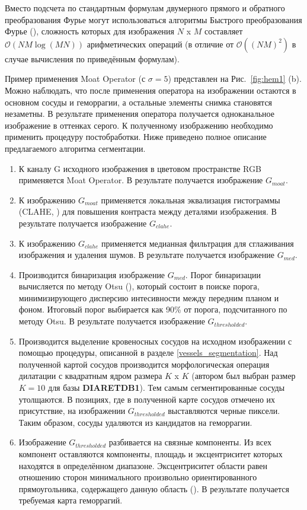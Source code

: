 \documentclass[12pt,fleqn]{article}
\begin{document}
Вместо подсчета по стандартным формулам двумерного прямого и обратного преобразования Фурье могут использоваться алгоритмы Быстрого преобразования Фурье (\cite[стр. 134]{szeliski}), сложность которых для изображения $N$ x $M$ составляет $\mathcal{O}(NM \log(MN))$ арифметических операций (в отличие от $\mathcal{O}\left((NM)^2\right)$ в случае вычисления по приведённым формулам). 

Пример применения Moat Operator (с $\sigma = 5$) представлен на Рис.~\ref{fig:hem1} (b). Можно наблюдать, что после применения оператора на изображении остаются в основном сосуды и геморрагии, а остальные элементы снимка становятся незаметны. В результате применения оператора получается одноканальное изображение в оттенках серого. К полученному изображению необходимо применить процедуру постобработки. Ниже приведено полное описание предлагаемого алгоритма сегментации.

\begin{enumerate}
\item К каналу G исходного изображения в цветовом пространстве RGB применяется Moat Operator. В результате получается изображение $G_{moat}$.
\item К изображению $G_{moat}$ применяется локальная эквализация гистограммы (CLAHE, \cite[стр. 110]{szeliski}) для повышения контраста между деталями изображения. В результате получается изображение $G_{clahe}$.
\item К изображению $G_{clahe}$ применяется медианная фильтрация для сглаживания изображения и удаления шумов. В результате получается изображение $G_{med}$.
\item Производится бинаризация изображение $G_{med}$. Порог бинаризации вычисляется по методу Otsu (\cite{otsu}), который состоит в поиске порога, минимизирующего дисперсию интесивности между передним планом и фоном. Итоговый порог выбирается как 90\% от порога, подсчитанного по методу Otsu. В результате получается изображение $G_{thresholded}$.
\item Производится выделение кровеносных сосудов на исходном изображении с помощью процедуры, описанной в разделе \ref{vessels_segmentation}. Над полученной картой сосудов производится морфологическая операция дилатации с квадратным ядром размера $K$ x $K$ (автором был выбран размер $K = 10$ для базы \textbf{DIARETDB1}). Тем самым сегментированные сосуды утолщаются. В позициях, где в полученной карте сосудов отмечено их присутствие, на изображении $G_{thresholded}$ выставляются черные пиксели. Таким образом, сосуды удаляются из кандидатов на геморрагии.
\item Изображение $G_{thresholded}$ разбивается на связные компоненты. Из всех компонент оставляются компоненты, площадь и эксцентриситет которых находятся в определённом диапазоне. Эксцентриситет области равен отношению сторон минимального произвольно ориентированного прямоугольника, содержащего данную область (\cite[стр. 6]{shapes}). В результате получается требуемая карта геморрагий.

\end{enumerate}
\end{document}
